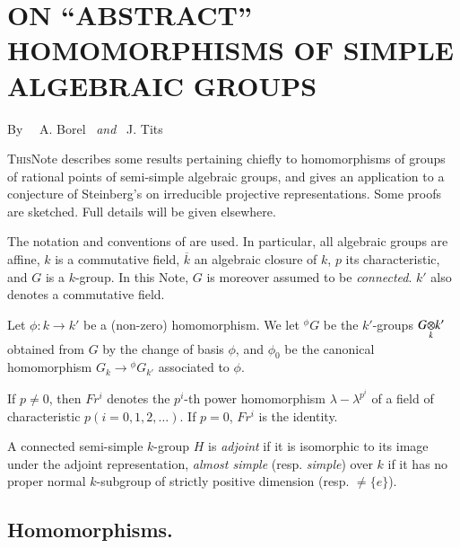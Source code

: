 \chapter[\textsc{A. Borel} and \textsc{J. Tits~:} On ``Abstract'' Homomorphisms of Simple Algebraic Groups]{ON ``ABSTRACT'' HOMOMORPHISMS OF SIMPLE ALGEBRAIC GROUPS}\label{art05}

\begin{center}
By~~ A. Borel ~{\em and}~ J. Tits
\end{center}


\setcounter{pageoriginal}{74}
\textsc{This}\pageoriginale Note describes some results pertaining chiefly to homomorphisms of groups of rational points of semi-simple algebraic groups, and gives an application to a conjecture of Steinberg's \cite{art05-key9} on irreducible projective representations. Some proofs are sketched. Full details will be given elsewhere.

\begin{notation*}
The notation and conventions of \cite{art05-key1} are used. In particular, all algebraic groups are affine, $k$ is a commutative field, $\overline{k}$ an algebraic closure of $k$, $p$ its characteristic, and $G$ is a $k$-group. In this Note, $G$ is moreover assumed to be {\em connected}. $k'$ also denotes a commutative field.
\end{notation*}

Let $\phi:k\to k'$ be a (non-zero) homomorphism. We let ${}^{\phi}G$ be the $k'$-groups $\foprod{G}{k'}{k}$ obtained from $G$ by the change of basis $\phi$, and $\phi_{0}$ be the canonical homomorphism $G_{k}\to {}^{\phi}G_{k'}$ associated to $\phi$.

If $p\neq 0$, then $Fr^{i}$ denotes the $p^{i}$-th power homomorphism $\lambda-\lambda^{p^{i}}$ of a field of characteristic $p(i=0,1,2,\ldots)$. If $p=0$, $Fr^{i}$ is the identity.

A connected semi-simple $k$-group $H$ is {\em adjoint} if it is isomorphic to its image under the adjoint representation, {\em almost simple} (resp. {\em simple}) over $k$ if it has no proper normal $k$-subgroup of strictly positive dimension (resp. $\neq \{e\}$).

\section{Homomorphisms.}\label{art05-sec1}

